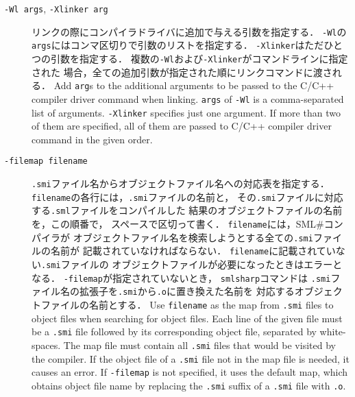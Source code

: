\documentclass{jbook}
\newcommand{\smlsharp}{SML\#}
\newcommand{\term}[1]{\mbox{{\tt #1}}}
\begin{document}
\begin{description}
\item[{\tt -Wl \term{args}},
      {\tt -Xlinker \term{arg}}]
\ifjp%
	リンクの際にコンパイラドライバに追加で与える引数を指定する．
	{\tt -Wl}の\term{args}にはコンマ区切りで引数のリストを指定する．
	{\tt -Xlinker}はただひとつの引数を指定する．
	複数の{\tt -Wl}および{\tt -Xlinker}がコマンドラインに指定された
場合，全ての追加引数が指定された順にリンクコマンドに渡される．
\else%
	Add \term{arg}s to the additional arguments to be passed to
the C/C++ compiler driver command when linking.
	\term{args} of {\tt -Wl} is a comma-separated list of arguments.
	{\tt -Xlinker} specifies just one argument.
	If more than two of them are specified,
all of them are passed to C/C++ compiler driver command in the given order.
\fi%

\item[{\tt -filemap \term{filename}}]
\ifjp%
	{\tt .smi}ファイル名からオブジェクトファイル名への対応表を指定する．
	\term{filename}の各行には，{\tt .smi}ファイルの名前と，
その{\tt .smi}ファイルに対応する{\tt .sml}ファイルをコンパイルした
結果のオブジェクトファイルの名前を，この順番で，
スペースで区切って書く．
	\term{filename}には，\smlsharp{}コンパイラが
オブジェクトファイル名を検索しようとする全ての{\tt .smi}ファイルの名前が
記載されていなければならない．
	\term{filename}に記載されていない{\tt .smi}ファイルの
オブジェクトファイルが必要になったときはエラーとなる．
	{\tt -filemap}が指定されていないとき，
{\tt smlsharp}コマンドは
{\tt .smi}ファイル名の拡張子を{\tt .smi}から{\tt .o}に置き換えた名前を
対応するオブジェクトファイルの名前とする．
\else%
	Use \term{filename} as the map from {\tt .smi} files to object files
when searching for object files.
	Each line of the given file must be a {\tt .smi} file
followed by its corresponding object file, separated by white-spaces.
	The map file must contain all {\tt .smi} files that would be visited
by the compiler.
	If the object file of a {\tt .smi} file not in the map file 
is needed, it causes an error.
	If {\tt -filemap} is not specified,
it uses the default map, which obtains object file name by replacing
the {\tt .smi} suffix of a {\tt .smi} file with {\tt .o}.
\fi%


\end{description}
\end{document}
